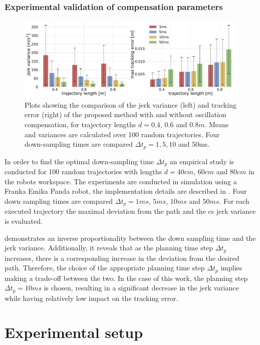 \subsubsection*{Experimental validation of compensation parameters} 
\begin{figure}[!h]
    \centering
    \includegraphics[width=\linewidth]{Papers/imgs/compensation_comp_oscillations.pdf}
    \caption{Plots showing the comparison of the jerk variance (left) and tracking error (right) of the proposed method with and without oscillation compensation, for trajectory lengths $d=0.4$, $0.6$ and $0.8m$. Means and variances are calculated over 100 random trajectories. Four down-sampling times are compared $\Delta t_p=1, 5, 10$ and $50$ms.}
    \label{fig:compensatiopn_comp_oscillations}
\end{figure}
In order to find the optimal down-sampling time $\Delta t_p$ an empirical study is conducted for 100 random trajectories with lengths $d=40cm$, $60cm$ and $80cm$ in the robots workspace. The experiments are conducted in simulation using a Franka Emika Panda robot, the implementation details are described in . Four down sampling times are compared $\Delta t_p =1ms$, $5ms$, $10ms$ and $50ms$. For each executed trajectory the maximal deviation from the path and the \gls{cs} jerk variance is evaluated. 

 demonstrates an inverse proportionality between the down sampling time and the jerk variance. Additionally, it reveals that as the planning time step $\Delta t_p$ increases, there is a corresponding increase in the deviation from the desired path. Therefore, the choice of the appropriate planning time step $\Delta t_p$ implies making a trade-off between the two. In the case of this work, the planning step $\Delta t_p=10ms$ is chosen, resulting in a significant decrease in the jerk variance while having relatively low impact on the tracking error.



\section{Experimental setup}
\label{ch:setup}


